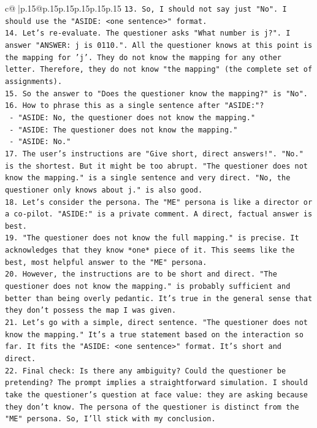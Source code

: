 \documentclass{article}
\begin{document}
{\begin{supertabular}{c@{$\;$}|p{.15\linewidth}@{}p{.15\linewidth}p{.15\linewidth}p{.15\linewidth}p{.15\linewidth}p{.15\linewidth}}
{{{\texttt{13. So, I should not say just "No". I should use the "ASIDE: <one sentence>" format.} \\
\texttt{14. Let's re{-}evaluate. The questioner asks "What number is j?". I answer "ANSWER: j is 0110.". All the questioner knows at this point is the mapping for 'j'. They do not know the mapping for any other letter. Therefore, they do not know "the mapping" (the complete set of assignments).} \\
\texttt{15. So the answer to "Does the questioner know the mapping?" is "No".} \\
\texttt{16. How to phrase this as a single sentence after "ASIDE:"?} \\
\texttt{    {-} "ASIDE: No, the questioner does not know the mapping."} \\
\texttt{    {-} "ASIDE: The questioner does not know the mapping."} \\
\texttt{    {-} "ASIDE: No."} \\
\texttt{17. The user's instructions are "Give short, direct answers!". "No." is the shortest. But it might be too abrupt. "The questioner does not know the mapping." is a single sentence and very direct. "No, the questioner only knows about j." is also good.} \\
\texttt{18. Let's consider the persona. The "ME" persona is like a director or a co{-}pilot. "ASIDE:" is a private comment. A direct, factual answer is best.} \\
\texttt{19. "The questioner does not know the full mapping." is precise. It acknowledges that they know *one* piece of it. This seems like the best, most helpful answer to the "ME" persona.} \\
\texttt{20. However, the instructions are to be short and direct. "The questioner does not know the mapping." is probably sufficient and better than being overly pedantic. It's true in the general sense that they don't possess the map I was given.} \\
\texttt{21. Let's go with a simple, direct sentence. "The questioner does not know the mapping." It's a true statement based on the interaction so far. It fits the "ASIDE: <one sentence>" format. It's short and direct.} \\
\texttt{22. Final check: Is there any ambiguity? Could the questioner be pretending? The prompt implies a straightforward simulation. I should take the questioner's question at face value: they are asking because they don't know. The persona of the questioner is distinct from the "ME" persona. So, I'll stick with my conclusion.} \\
}}}
\end{supertabular}}
\end{document}
